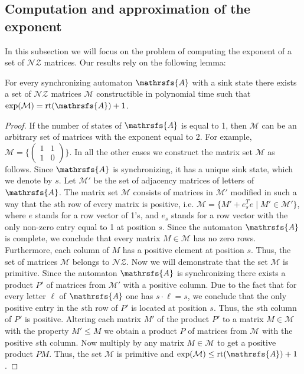 \documentclass[a4paper,USenglish]{lipics}
\DeclareMathOperator{\rt}{rt}
\theoremstyle{definition}
\begin{document}
\subsection{Computation and approximation of the exponent}
In this subsection we will focus on the problem of computing the exponent of a set of $\mathscr{NZ}$ matrices. Our results rely on the following lemma:
\begin{lemma}
\label{lemma:zeronzrc}
For every synchronizing automaton $\mathrsfs{A}$ with a sink state there exists a set of $\mathscr{NZ}$ matrices $\mathcal{M}$ constructible in polynomial time such that $\exp(\mathcal{M}) = \rt(\mathrsfs{A}) + 1$.
\end{lemma}
\begin{proof}
If the number of states of $\mathrsfs{A}$ is equal to 1, then $\mathcal{M}$ can be an arbitrary set of matrices with the exponent equal to 2. For example,
$\mathcal{M} = \{\left( \begin{smallmatrix} 1&1\\ 1&0 \end{smallmatrix} \right)\}$.
In all the other cases we construct the matrix set $\mathcal{M}$ as follows. Since $\mathrsfs{A}$ is synchronizing, it has a unique sink state, which we denote by $s$. Let $\mathcal{M'}$ be the set of adjacency matrices of letters of $\mathrsfs{A}$. The matrix set $\mathcal{M}$ consists of matrices in $\mathcal{M'}$ modified in such a way that the $s$th row of every matrix is positive, i.e. $\mathcal{M} = \{ M' + e_s^Te \mid M' \in \mathcal{M'}\}$, where $e$ stands for a row vector of 1's, and $e_s$ stands for a row vector with the only non-zero entry equal to 1 at position $s$. Since the automaton $\mathrsfs{A}$ is complete, we conclude that every matrix $M \in \mathcal{M}$ has no zero rows. Furthermore, each column of $M$ has a positive element at position $s$. Thus, the set of matrices $\mathcal{M}$ belongs to $\mathscr{NZ}$. Now we will demonstrate that the set $\mathcal{M}$ is primitive. Since the automaton $\mathrsfs{A}$ is synchronizing there exists a product $P'$ of matrices from $\mathcal{M'}$ with a positive column. Due to the fact that for every letter $\ell$ of $\mathrsfs{A}$ one has $s\cdot\ell=s$, we conclude that the only positive entry in the $s$th row of $P'$ is located at position $s$. Thus, the $s$th column of $P'$ is positive. Altering each matrix $M'$ of the product $P'$ to a matrix $M \in \mathcal{M}$ with the property $M' \leq M$ we obtain a product $P$ of matrices from $\mathcal{M}$ with the positive $s$th column. 
Now multiply by any matrix $M \in \mathcal{M}$ to get a positive product $PM$. Thus, the set $\mathcal{M}$ is primitive and $\exp(\mathcal{M}) \leq \rt(\mathrsfs{A}) + 1$.


\end{proof}
\end{document}
